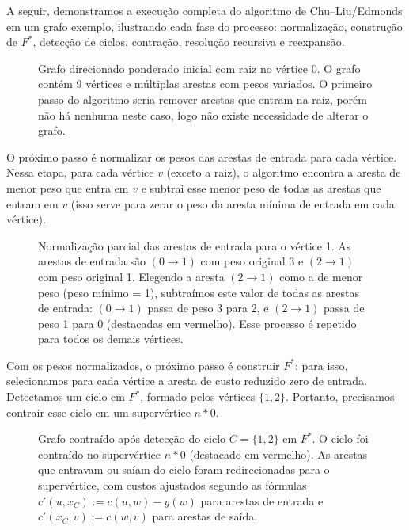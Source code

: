 A seguir, demonstramos a execução completa do algoritmo de Chu--Liu/Edmonds em um grafo exemplo, ilustrando cada fase do processo: normalização, construção de $F^*$, detecção de ciclos, contração, resolução recursiva e reexpansão.

\begin{figure}[H]
    \centering
    
    \caption{Grafo direcionado ponderado inicial com raiz no vértice 0. O grafo contém 9 vértices e múltiplas arestas com pesos variados. O primeiro passo do algoritmo seria remover arestas que entram na raiz, porém não há nenhuma neste caso, logo não existe necessidade de alterar o grafo.}
    \label{fig:exemplo-grafo-inicial}
\end{figure}

O próximo passo é normalizar os pesos das arestas de entrada para cada vértice. Nessa etapa, para cada vértice $v$ (exceto a raiz), o algoritmo encontra a aresta de menor peso que entra em $v$ e subtrai esse menor peso de todas as arestas que entram em $v$ (isso serve para zerar o peso da aresta mínima de entrada em cada vértice).

\begin{figure}[H]
    \centering
    
    \caption{Normalização parcial das arestas de entrada para o vértice 1. As arestas de entrada são $(0 \to 1)$ com peso original 3 e $(2 \to 1)$ com peso original 1. Elegendo a aresta $(2 \to 1)$ como a de menor peso (peso mínimo = 1), subtraímos este valor de todas as arestas de entrada: $(0 \to 1)$ passa de peso 3 para 2, e $(2 \to 1)$ passa de peso 1 para 0 (destacadas em vermelho). Esse processo é repetido para todos os demais vértices.}
    \label{fig:exemplo-normalizacao-parcial}
\end{figure}

Com os pesos normalizados, o próximo passo é construir $F^*$: para isso, selecionamos para cada vértice a aresta de custo reduzido zero de entrada. Detectamos um ciclo em $F^*$, formado pelos vértices $\{1, 2\}$. Portanto, precisamos contrair esse ciclo em um supervértice $n*0$.

\begin{figure}[H]
    \centering
    
    \caption{Grafo contraído após detecção do ciclo $C = \{1, 2\}$ em $F^*$. O ciclo foi contraído no supervértice $n*0$ (destacado em vermelho). As arestas que entravam ou saíam do ciclo foram redirecionadas para o supervértice, com custos ajustados segundo as fórmulas $c'(u,x_C) := c(u,w) - y(w)$ para arestas de entrada e $c'(x_C,v) := c(w,v)$ para arestas de saída.}
    \label{fig:exemplo-grafo-contraido}
\end{figure}

